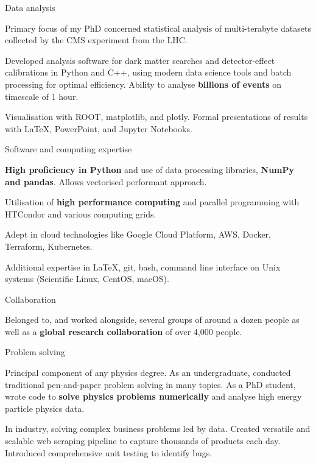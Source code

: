 
\begin{cventries}

    \cventry
    {} %
    {Data analysis} %
    {} %
    {} %
    {
      \begin{cvitems}
        \item {Primary focus of my PhD concerned statistical analysis of multi-terabyte datasets collected by the CMS experiment from the LHC.}
        \item {Developed analysis software for dark matter searches and detector-effect calibrations in Python and C++, using modern data science tools and batch processing for optimal efficiency. Ability to analyse \textbf{billions of events} on timescale of 1 hour.}
        \item {Visualisation with ROOT, matplotlib, and plotly. Formal presentations of results with LaTeX, PowerPoint, and Jupyter Notebooks.}
        \end{cvitems}
    }

    \cventry
    {} %
    {Software and computing expertise} %
    {} %
    {} %
    {
      \begin{cvitems}
        \item {\textbf{High proficiency in Python} and use of data processing libraries, \textbf{NumPy and pandas}. Allows vectorised performant approach.}
        \item {Utilisation of \textbf{high performance computing} and parallel programming with HTCondor and various computing grids.}
        \item {Adept in cloud technologies like Google Cloud Platform, AWS, Docker, Terraform, Kubernetes.}
        \item {Additional expertise in LaTeX, git, bash, command line interface on Unix systems (Scientific Linux, CentOS, macOS).}
        \end{cvitems}
    }

    \cventry
    {}
    {Collaboration}
    {}
    {}
    {
      \begin{cvitems}
        \item {Belonged to, and worked alongside, several groups of around a dozen people as well as a \textbf{global research collaboration} of over 4,000 people.}
        \end{cvitems}
    }

    \cventry
    {}
    {Problem solving}
    {}
    {}
    {
      \begin{cvitems}
        \item {Principal component of any physics degree. As an undergraduate, conducted traditional pen-and-paper problem solving in many topics. As a PhD student, wrote code to \textbf{solve physics problems numerically} and analyse high energy particle physics data.}
        \item {In industry, solving complex business problems led by data. Created versatile and scalable web scraping pipeline to capture thousands of products each day. Introduced comprehensive unit testing to identify bugs.}
        \end{cvitems}
    }


\end{cventries}
